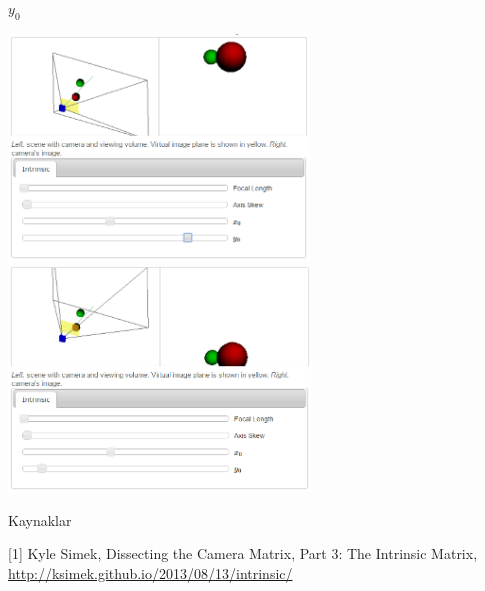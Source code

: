 \documentclass[12pt,fleqn]{article}\usepackage{../../common}
\begin{document}
$y_0$

\includegraphics[height=6cm]{05_05.png}
\includegraphics[height=6cm]{05_06.png}


Kaynaklar

[1] Kyle Simek, Dissecting the Camera Matrix, Part 3: The Intrinsic Matrix,
\url{http://ksimek.github.io/2013/08/13/intrinsic/}
\end{document}
